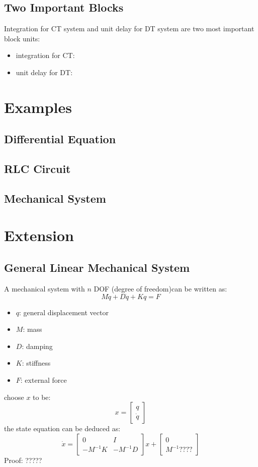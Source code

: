 \documentclass[10pt,a4paper,oneside]{article}
\begin{document}
\subsection{Two Important Blocks}
Integration for CT system and unit delay for DT system are two most important block units:
\begin{itemize}
	\item integration for CT:
	\item unit delay for DT:
\end{itemize}

\section{Examples}
\subsection{Differential Equation}
\subsection{RLC Circuit}
\subsection{Mechanical System}


\section{Extension}
\subsection{General Linear Mechanical System}
A mechanical system with $n$ DOF (degree of freedom)can be written as:
\[
M\ddot{q} + D\dot{q} + Kq = F
\]
\begin{itemize}
	\item $q$: general displacement vector
	\item $M$: mass
	\item $D$: damping
	\item $K$: stiffness
	\item $F$: external force
\end{itemize}
choose $x$ to be:
\[
x = \begin{bmatrix}
q\\
\dot{q}
\end{bmatrix}
\]
the state equation can be deduced as:
\[
\dot{x} = \begin{bmatrix}
0 & I\\ -M^{-1}K & -M^{-1}D
\end{bmatrix}x
+ \begin{bmatrix}
0 \\ M^{-1}????
\end{bmatrix}
\]
Proof:
?????
\end{document}
